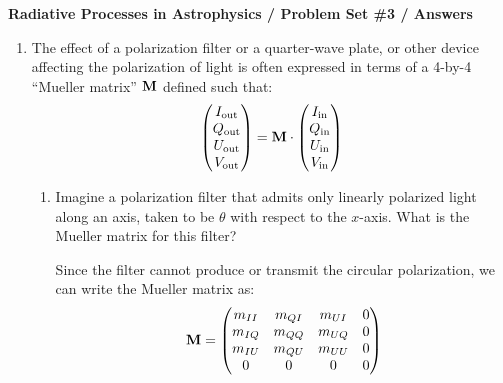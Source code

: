 \documentclass[11pt, preprint]{article}
\begin{document}
\begin{center}
  {\bf Radiative Processes in Astrophysics / Problem Set \#3 /
    Answers}
\end{center}


\begin{enumerate}
\item The effect of a polarization filter or a quarter-wave plate, or
  other device affecting the polarization of light is often expressed
  in terms of a 4-by-4 ``Mueller matrix'' ${\bf M}$ defined such that:
  \begin{equation}
    \begin{pmatrix}
      I_{\rm out} \\
      Q_{\rm out} \\
      U_{\rm out} \\
      V_{\rm out} \\
    \end{pmatrix}
    = 
    {\bf M} 
    \cdot
    \begin{pmatrix}
      I_{\rm in} \\
      Q_{\rm in} \\
      U_{\rm in} \\
      V_{\rm in} \\
    \end{pmatrix}
  \end{equation}

  \begin{enumerate}
    \item Imagine a polarization filter that admits only linearly polarized
  light along an axis, taken to be $\theta$ with respect to the
  $x$-axis. What is the Mueller matrix for this filter?

  \begin{answer}
    Since the filter cannot produce or transmit the circular
    polarization, we can write the Mueller matrix as:
    \begin{equation}
      {\bf M} = \begin{pmatrix}
        m_{II} & m_{QI} & m_{UI} & 0 \\
        m_{IQ} & m_{QQ} & m_{UQ} & 0 \\
        m_{IU} & m_{QU} & m_{UU} & 0 \\
        0 & 0 & 0 & 0
      \end{pmatrix}
    \end{equation}


\end{answer}
\end{enumerate}
\end{enumerate}
\end{document}
